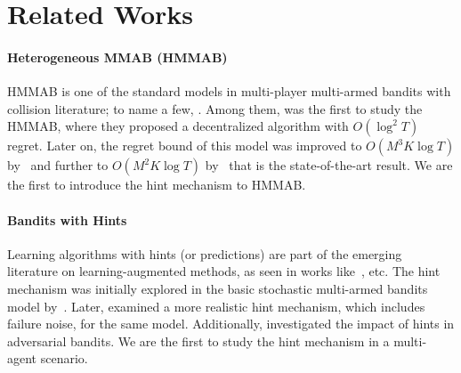 \section{Related Works}
\paragraph{Heterogeneous MMAB (HMMAB)}
HMMAB is one of the standard models in multi-player multi-armed bandits with collision literature; to name a few, \citet{rosenski2016multi,boursier2019sic,mehrabian2020practical,bistritz2018distributed,shi2021heterogeneous}.
Among them, \citet{bistritz2018distributed} was the first to study the HMMAB, where they proposed a decentralized algorithm with $O(\log^2 T)$ regret.
Later on, the regret bound of this model was improved to \(O(M^3K\log T)\) by~\citet{mehrabian2020practical} and further to \(O(M^2K\log T)\) by~\citet{shi2021heterogeneous} that is the state-of-the-art result.
We are the first to introduce the hint mechanism to HMMAB.


\paragraph{Bandits with Hints}
Learning algorithms with hints (or predictions) are part of the emerging literature on learning-augmented methods, as seen in works like~\citep{lykouris2021competitive,purohit2018improving,mitzenmacher2022algorithms}, etc. The hint mechanism was initially explored in the basic stochastic multi-armed bandits model by~\citet{yun2018multi}. Later, \citet{lindstaahl2020predictive} examined a more realistic hint mechanism, which includes failure noise, for the same model. Additionally, \citet{bhaskara2023bandit} investigated the impact of hints in adversarial bandits. We are the first to study the hint mechanism in a multi-agent scenario.



